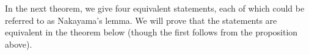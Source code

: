 \documentclass{ximera}
\begin{document}

In the next theorem, we give four equivalent statements, each of which
could be referred to as Nakayama's lemma. We will prove that the
statements are equivalent in the theorem below (though the first
follows from the proposition above).
\end{document}
